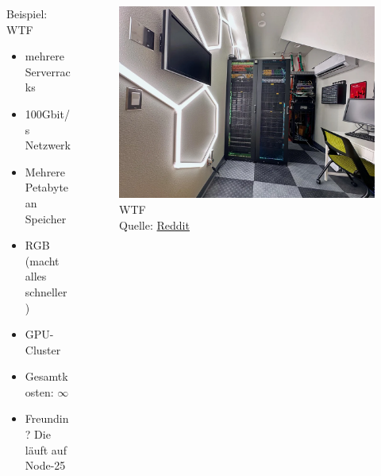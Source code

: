 \documentclass[
    ngerman,
    accentcolor=3b,
    fontsize= 12pt,
    a4paper,
    aspectratio=169,
    colorback=true,
    fancy_row_colors,
    leqno,
    fleqn,
    boxarc=3pt,
    fleqn,
    main,
    design=2008,
]{algoslides}
\begin{document}
    \begin{frame}
        \slidehead{}
        \begin{columns}[T]
            \begin{column}{.5\textwidth}
                Beispiel: WTF
                \begin{itemize}
                    \item mehrere Serverracks
                    \item 100Gbit/s Netzwerk
                    \item Mehrere Petabyte an Speicher
                    \item RGB (macht alles schneller)
                    \item GPU-Cluster
                    \item Gesamtkosten: $\infty$
                    \item Freundin? Die läuft auf Node-25
                \end{itemize}
            \end{column}%
            \begin{column}{.5\textwidth}
                \begin{figure}[ht!]
                    \centering
                    \includegraphics[height=.5\textheight]{wtf-homelab.png}
                    \caption{WTF\\Quelle: \href{https://www.reddit.com/r/homelab/comments/1bn3p75/the_never_ending_cable_cleanup_a_weekend_of/}{Reddit}}
                    \label{fig:wtf-homelab}
                \end{figure}
            \end{column}%
        \end{columns}
    \end{frame}
\end{document}
